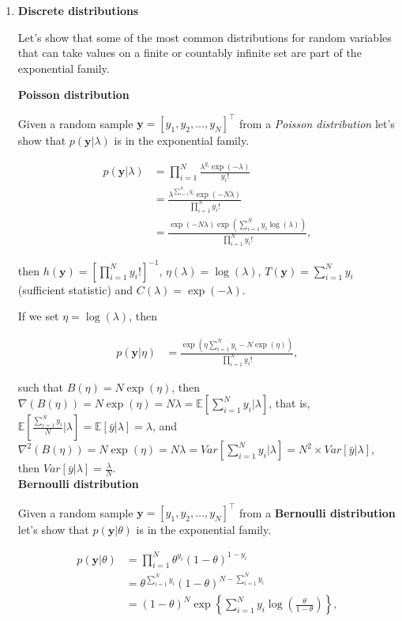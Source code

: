 \begin{enumerate}

\item \textbf{Discrete distributions}

Let's show that some of the most common distributions for random variables that can take values on a finite or countably infinite set are part of the exponential family.
 
\textbf{Poisson distribution} 

Given a random sample $\mathbf{y}=[y_1,y_2,\dots,y_N]^{\top}$ from a \textit{Poisson distribution} let's show that $p(\mathbf{y}|\lambda)$ is in the exponential family.

\begin{align}
	p(\mathbf{y}|\lambda)&=\prod_{i=1}^N \frac{\lambda^{y_i} \exp(-\lambda)}{y_i!}\nonumber\\
	&=\frac{\lambda^{\sum_{i=1}^N y_i}\exp(-N\lambda)}{\prod_{i=1}^N y_i!}\nonumber\\
	&=\frac{\exp(-N\lambda)\exp(\sum_{i=1}^Ny_i\log(\lambda))}{\prod_{i=1}^N y_i!}\nonumber,
\end{align}

then $h(\mathbf{y})=\left[\prod_{i=1}^N y_i!\right]^{-1}$, $\eta(\lambda)=\log(\lambda)$, $T(\mathbf{y})=\sum_{i=1}^N y_i$ (sufficient statistic) and $C(\lambda)=\exp(-\lambda)$.

If we set $\eta=\log(\lambda)$, then 

\begin{align}
	p(\mathbf{y}|\eta)&=\frac{\exp(\eta\sum_{i=1}^Ny_i-N\exp(\eta))}{\prod_{i=1}^N y_i!},\nonumber
\end{align}

such that $B(\eta)=N\exp(\eta)$, then $\nabla(B(\eta))=N\exp(\eta)=N\lambda=\mathbb{E}\left[\sum_{i=1}^N y_i\biggr\rvert\lambda\right]$, that is, $\mathbb{E}\left[\frac{\sum_{i=1}^N y_i}{N}\biggr\rvert\lambda\right]=\mathbb{E}[\bar{y}|\lambda]=\lambda$, and $\nabla^2(B(\eta))=N\exp(\eta)=N\lambda=Var\left[\sum_{i=1}^N y_i\biggr\rvert\lambda\right]=N^2 \times Var\left[\bar{y}\rvert\lambda\right]$, then $Var\left[\bar{y}\rvert\lambda\right]=\frac{\lambda}{N}$.\\ 

\textbf{Bernoulli distribution}

Given a random sample $\mathbf{y}=[y_1,y_2,\dots,y_N]^{\top}$ from a \textbf{Bernoulli distribution} let's show that $p(\mathbf{y}|\theta)$ is in the exponential family.


\begin{align}
	p(\mathbf{y}|\theta)&=\prod_{i=1}^N \theta^{y_i}(1-\theta)^{1-y_i}\nonumber\\
	&=\theta^{\sum_{i=1}^N y_i}(1-\theta)^{N-\sum_{i=1}^N y_i}\nonumber\\
	&=(1-\theta)^N\exp\left\{\sum_{i=1}^N y_i\log\left(\frac{\theta}{1-\theta}\right)\right\}\nonumber,
\end{align}


\end{enumerate}
